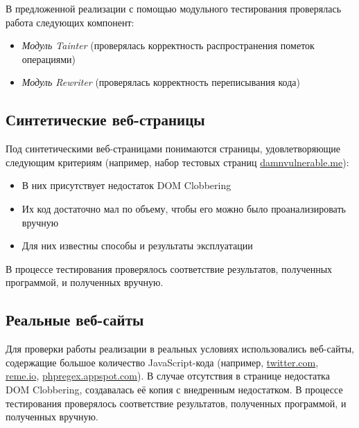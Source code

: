 	В предложенной реализации с помощью модульного тестирования проверялась работа следующих компонент:
	\begin{itemize}
		\item \textit{Модуль Tainter} (проверялась корректность распространения пометок операциями)
		\item \textit{Модуль Rewriter} (проверялась корректность переписывания кода)
	\end{itemize}

\subsection{Синтетические веб-страницы}
	Под синтетическими веб-страницами понимаются страницы, удовлетворяющие следующим критериям (например, набор тестовых страниц  \url{damnvulnerable.me}): 

	\begin{itemize}
		\item В них присутствует недостаток DOM Clobbering
		\item Их код достаточно мал по объему, чтобы его можно было проанализировать вручную
		\item Для них известны способы и результаты эксплуатации
	\end{itemize}


	В процессе тестирования проверялось соответствие результатов, полученных программой, и полученных вручную.

\subsection{Реальные веб-сайты}
	Для проверки работы реализации в реальных условиях использовались веб-сайты, содержащие большое количество JavaScript-кода (например, \url{twitter.com}, \url{reme.io}, \url{phpregex.appspot.com}). В случае отсутствия в странице недостатка DOM Clobbering, создавалась её копия с внедренным недостатком. В процессе тестирования проверялось соответствие результатов, полученных программой, и полученных вручную.

